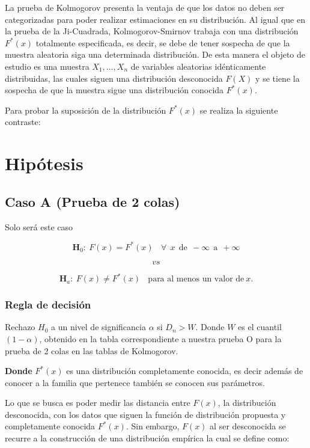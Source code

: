 \documentclass[
  a4paper,
  oneside,
  openany]{book}
\begin{document}
La prueba de Kolmogorov presenta la ventaja de que los datos no deben ser categorizadas para poder realizar estimaciones en su distribución. Al igual que en la prueba de la Ji-Cuadrada, Kolmogorov-Smirnov trabaja con una distribución \(F^*(x)\) totalmente especificada, es decir, se debe de tener sospecha de que la muestra aleatoria siga una determinada distribución. De esta manera el objeto de estudio es una muestra \(X_{1},\ldots,X_{n}\) de variables aleatorias idénticamente distribuidas, las cuales siguen una distribución desconocida \(F(X)\) y se tiene la sospecha de que la muestra sigue una distribución conocida \(F^*(x)\).

Para probar la suposición de la distribución \(F^*(x)\) se realiza la siguiente contraste:

\hypertarget{hipuxf3tesis-15}{%
\section{Hipótesis}\label{hipuxf3tesis-15}}

\hypertarget{caso-a-prueba-de-2-colas-2}{%
\subsection{Caso A (Prueba de 2 colas)}\label{caso-a-prueba-de-2-colas-2}}

Solo será este caso

\[\textbf{H}_0: \ F(x)=F^*(x) \ \ \ \ \forall \ \ x\ \  \mbox{de} \ \ -\infty \ \  \mbox{a} \ \  +\infty\]

\[vs\]

\[\textbf{H}_a: \ F(x) \neq F^*(x) \ \ \ \ \mbox{para al menos un valor de} \  x.\]

\hypertarget{regla-de-decisiuxf3n-31}{%
\subsubsection*{Regla de decisión}\label{regla-de-decisiuxf3n-31}}


Rechazo \(H_0\) a un nivel de significancia \(\alpha\) si \(D_{n}>W\). Donde \(W\) es el cuantil \((1-\alpha)\), obtenido en la tabla correspondiente a nuestra prueba O para la prueba de 2 colas en las tablas de Kolmogorov.

\textbf{Donde} \(F^*(x)\) es una distribución completamente conocida, es decir además de conocer a la familia que pertenece también se conocen sus parámetros.

Lo que se busca es poder medir las distancia entre \(F(x)\), la distribución desconocida, con
los datos que siguen la función de distribución propuesta y completamente conocida \(F^*(x)\).
Sin embargo, \(F(x)\) al ser desconocida se recurre a la construcción de una distribución empírica
la cual se define como:
\end{document}
